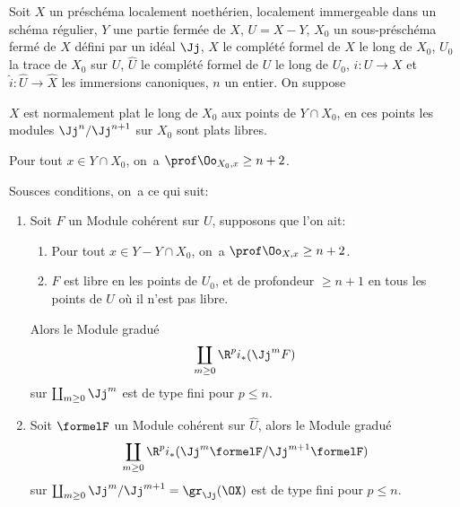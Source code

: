 \begin{theoreme} \label{XII.4.1} Soit $X$ un pr\'esch\'ema localement noeth\'erien, localement immergeable dans un sch\'ema r\'egulier, $Y$ une partie ferm\'ee de $X$, $U=X- Y$, $X_0$ un sous-pr\'esch\'ema ferm\'e de $X$ d\'efini par un id\'eal $\Jj$, $\widehat{X}$ le compl\'et\'e formel de $X$ le long de $X_0$, $U_0$ la trace de $X_0$ sur $U$, $\widehat{U}$ le compl\'et\'e formel de $U$ le long de $U_0$, $i:U\to X$ et $\widehat{i}:\widehat{U}\to \widehat{X}$ les immersions canoniques, $n$ un entier. On suppose
\begin{enumeratea}
\item
$X$ est normalement plat le long de $X_0$ aux points de $Y\cap X_0$, \ie en ces points les modules $\Jj^n/\Jj^{n+1}$ sur $X_0$ sont plats \ie \ignorespaces libres.
\item
Pour tout $x\in Y\cap X_0$, on~a $\prof \Oo_{X_0, x}\geq n+2$.
\end{enumeratea}
Sous\pageoriginale ces conditions, on~a ce qui suit:
\begin{enumerate}
\item[$1^\circ)$] Soit $F$ un Module coh\'erent sur $U$, supposons que l'on ait:
\begin{enumerate}
\item[\textup{c)}] Pour tout $x\in Y- Y\cap X_0$, on~a $\prof \Oo_{X, x}\geq n+2$.

\item[\textup{d)}] $F$ est libre en les points de $U_0$, et de profondeur $\geq n+1$ en tous les points de $U$ o\`u il n'est pas libre.
\end{enumerate}
Alors le Module gradu\'e
\[
\coprod_{m\geq 0}\R^pi_\ast(\Jj^mF)
\]
sur $\coprod_{m\geq 0}\Jj^m$ est de type fini pour $p\leq n$. \item[$2^\circ$] Soit $\formelF$ un Module coh\'erent sur $\widehat{U}$, alors le Module gradu\'e
\[
\coprod_{m\geq 0}\R^pi_\ast(\Jj^m\formelF/\Jj^{m+1}\formelF)
\]
sur $\coprod_{m\geq 0}\Jj^m/\Jj^{m+1}=\gr_{\Jj}(\OX)$ est de type fini pour $p\leq n$.
\end{enumerate}
\end{theoreme}

